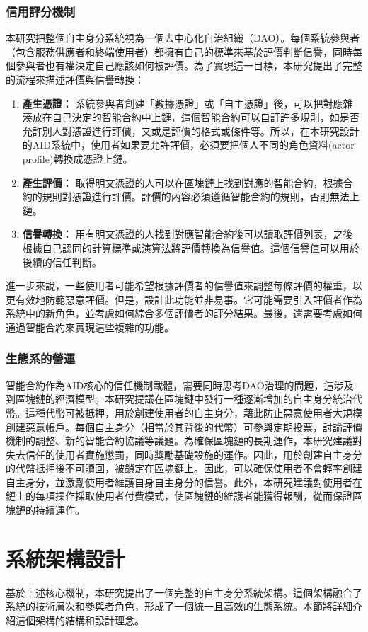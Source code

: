 \subsubsection{信用評分機制}
本研究把整個自主身分系統視為一個去中心化自治組織（DAO）。每個系統參與者（包含服務供應者和終端使用者）都擁有自己的標準來基於評價判斷信譽，同時每個參與者也有權決定自己應該如何被評價。為了實現這一目標，本研究提出了完整的流程來描述評價與信譽轉換：
\begin{enumerate}
  \item \textbf{產生憑證：} 系統參與者創建「數據憑證」或「自主憑證」後，可以把對應雜湊放在自己決定的智能合約中上鏈，這個智能合約可以自訂許多規則，如是否允許別人對憑證進行評價，又或是評價的格式或條件等。所以，在本研究設計的AID系統中，使用者如果要允許評價，必須要把個人不同的角色資料(actor profile)轉換成憑證上鏈。
  \item \textbf{產生評價：} 取得明文憑證的人可以在區塊鏈上找到對應的智能合約，根據合約的規則對憑證進行評價。評價的內容必須遵循智能合約的規則，否則無法上鏈。
  \item \textbf{信譽轉換：} 用有明文憑證的人找到對應智能合約後可以讀取評價列表，之後根據自己認同的計算標準或演算法將評價轉換為信譽值。這個信譽值可以用於後續的信任判斷。
\end{enumerate}
進一步來說，一些使用者可能希望根據評價者的信譽值來調整每條評價的權重，以更有效地防範惡意評價。但是，設計此功能並非易事。它可能需要引入評價者作為系統中的新角色，並考慮如何綜合多個評價者的評分結果\cite{josang2006exploring}。最後，還需要考慮如何通過智能合約來實現這些複雜的功能。
\subsubsection{生態系的營運}
智能合約作為AID核心的信任機制載體，需要同時思考DAO治理的問題，這涉及到區塊鏈的經濟模型。本研究提議在區塊鏈中發行一種逐漸增加的自主身分統治代幣。這種代幣可被抵押，用於創建使用者的自主身分，藉此防止惡意使用者大規模創建惡意帳戶。每個自主身分（相當於其背後的代幣）可參與定期投票，討論評價機制的調整、新的智能合約協議等議題。為確保區塊鏈的長期運作，本研究建議對失去信任的使用者實施懲罰，同時獎勵基礎設施的運作。因此，用於創建自主身分的代幣抵押後不可贖回，被鎖定在區塊鏈上。因此，可以確保使用者不會輕率創建自主身分，並激勵使用者維護自身自主身分的信譽。此外，本研究建議對使用者在鏈上的每項操作採取使用者付費模式，使區塊鏈的維護者能獲得報酬，從而保證區塊鏈的持續運作。
\section{系統架構設計}
基於上述核心機制，本研究提出了一個完整的自主身分系統架構。這個架構融合了系統的技術層次和參與者角色，形成了一個統一且高效的生態系統。本節將詳細介紹這個架構的結構和設計理念。
